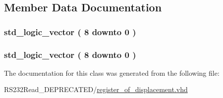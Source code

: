 \subsection{Member Data Documentation}
\hypertarget{classregister__of__displacement_1_1simple_abbd7ea6ffd0b7c1c791c633073814234}{}
\subsubsection[{Qn}]{ {\bfseries \textcolor{comment}{std\+\_\+logic\+\_\+vector}\textcolor{vhdlchar}{ }\textcolor{vhdlchar}{(}\textcolor{vhdlchar}{ }\textcolor{vhdlchar}{ } \textcolor{vhdldigit}{8} \textcolor{vhdlchar}{ }\textcolor{keywordflow}{downto}\textcolor{vhdlchar}{ }\textcolor{vhdlchar}{ } \textcolor{vhdldigit}{0} \textcolor{vhdlchar}{ }\textcolor{vhdlchar}{)}\textcolor{vhdlchar}{ }} \hspace{0.3cm}{\ttfamily [Signal]}}\label{classregister__of__displacement_1_1simple_abbd7ea6ffd0b7c1c791c633073814234}
\hypertarget{classregister__of__displacement_1_1simple_a5930cb4bd4c722ccf255f97959db7c6c}{}
\subsubsection[{Qp}]{ {\bfseries \textcolor{comment}{std\+\_\+logic\+\_\+vector}\textcolor{vhdlchar}{ }\textcolor{vhdlchar}{(}\textcolor{vhdlchar}{ }\textcolor{vhdlchar}{ } \textcolor{vhdldigit}{8} \textcolor{vhdlchar}{ }\textcolor{keywordflow}{downto}\textcolor{vhdlchar}{ }\textcolor{vhdlchar}{ } \textcolor{vhdldigit}{0} \textcolor{vhdlchar}{ }\textcolor{vhdlchar}{)}\textcolor{vhdlchar}{ }} \hspace{0.3cm}{\ttfamily [Signal]}}\label{classregister__of__displacement_1_1simple_a5930cb4bd4c722ccf255f97959db7c6c}


The documentation for this class was generated from the following file\+:\begin{DoxyCompactItemize}
\item 
R\+S232\+Read\+\_\+\+D\+E\+P\+R\+E\+C\+A\+T\+E\+D/\hyperlink{register__of__displacement_8vhd}{register\+\_\+of\+\_\+displacement.\+vhd}\end{DoxyCompactItemize}
